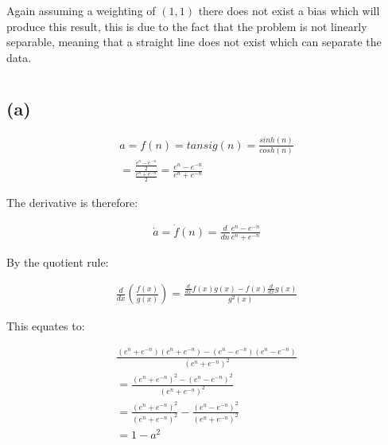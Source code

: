 \documentclass[paper=a4, fontsize=12pt]{article}%
\begin{document}
Again assuming a weighting of $(1,1)$ there does not exist a bias which will produce this result, this is due to the fact that the problem is not linearly separable, meaning that a straight line does not exist which can separate the data.
\section{ }
\subsection{(a)}

\begin{equation}
	\begin{aligned}
		a 	= f(n) 	= tansig(n) 	= \frac{sinh(n)}{cosh(n)} \\
			= \frac{\frac{e^n-e^{-n}}{2}}{\frac{e^n+e^{-n}}{2}} = \frac{e^n-e^{-n}}{e^n+e^{-n}}
	\end{aligned}
\end{equation}

The derivative is therefore:

\begin{equation}
	\begin{aligned}
		\dot{a} = \dot{f}(n) = \frac{d}{dn} \frac{e^n-e^{-n}}{e^n+e^{-n}}
	\end{aligned}
\end{equation}

By the quotient rule:

\begin{equation}
	\begin{aligned}
		\frac{d}{{dx}}\left( {\frac{{f\left( x \right)}}{{g\left( x \right)}}} \right) = \frac{{\frac{d}{{dx}}f\left( x \right)g\left( x \right) - f\left( x \right)\frac{d}{{dx}}g\left( x \right)}}{{g^2 \left( x \right)}}
	\end{aligned}
\end{equation}

This equates to:

\begin{equation}
	\begin{aligned}
		\frac{(e^n+e^{-n})(e^n+e^{-n}) - (e^n-e^{-n})(e^n-e^{-n})}{(e^n+e^{-n})^2} \\
		=	\frac{(e^n+e^{-n})^2 - (e^n-e^{-n})^2}{(e^n+e^{-n})^2} \\
		=	\frac{(e^n+e^{-n})^2}{(e^n+e^{-n})^2} - \frac{(e^n-e^{-n})^2}{(e^n+e^{-n})^2} \\
		= 	1 - a^2
	\end{aligned}
\end{equation}
\end{document}

